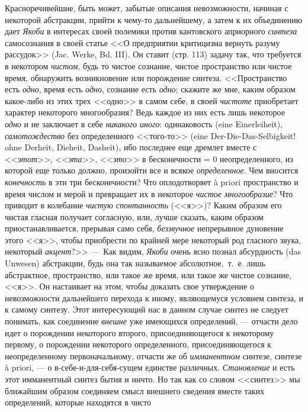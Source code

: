Красноречивейшие, быть может, забытые описания невозможности, начиная с
некоторой абстракции, прийти к чему-то дальнейшему, а затем к их
объединению дает {\em Якоби} в интересах своей полемики
против кантовского априорного {\em синтеза}
самосознания в своей статье <<О предприятии критицизма вернуть разуму
рассудок>> (Jac. Werke, Bd. III). Он ставит (стр. 113) задачу так, что
требуется в некотором {\em чистом}, будь то чистое
сознание, чистое пространство или чистое время, обнаружить возникновение
или порождение синтеза. <<Пространство есть {\em одно},
время есть {\em одно}, сознание есть
{\em одно}; скажите же мне, каким образом какое-либо из
этих трех <<одно>> в самом себе, в своей {\em чистоте}
приобретает характер некоторого многообразия? Ведь каждое из них есть лишь
некоторое {\em одно} и не заключает в себе
{\em никакого иного}: одинаковость (eine
Einerleiheit), {\em самотождество} без определенного
<<того-то>> (eine Der-Die-Das-Selbigkeit! ohne Derheit, Dieheit, Dasheit),
ибо последнее еще дремлет вместе с <<{\em этот}>>,
<<{\em эта}>>, <<{\em это}>> в
бесконечности = 0 неопределенного, из которой еще только должно, произойти
все и всякое {\em определенное}. Чем вносится
{\em конечность} в эти три бесконечности? Что
оплодотворяет à priori пространство и время числом и мерой и превращает их
в некоторое {\em чистое многообразие}? Что приводит в
колебание {\em чистую спонтанность} (<<я>>)? Каким
образом его чистая гласная получает согласную, или, лучше сказать, каким
образом приостанавливается, прерывая само себя,
{\em беззвучное} непрерывное дуновение этого <<я>>, чтобы
приобрести по крайней мере некоторый род гласного звука, некоторый
{\em акцент}?>> ---~Как видим,
{\em Якоби} очень ясно познал абсурдность (das Unwesen)
абстракции, будь она так называемое абсолютное,~т.~е. лишь абстрактное,
пространство, или такое же время, или такое же чистое сознание, <<я>>. Он
настаивает на этом, чтобы доказать свое утверждение о невозможности
дальнейшего перехода к иному, являющемуся условием синтеза, и к самому
синтезу. Этот интересующий нас в данном случае синтез не следует понимать,
как соединение {\em внешне} уже имеющихся определений,
--- отчасти дело идет о порождении некоторого второго, присоединяющегося к
некоторому первому, о порождении некоторого определенного,
присоединяющегося к неопределенному первоначальному, отчасти же об
{\em имманентном} синтезе, синтезе à priori, --- о
в-себе-и-для-себя-сущем единстве различных.
{\em Становление} и есть этот имманентный синтез бытия
и ничто. Но так как со словом <<синтез>> мы ближайшим образом соединяем смысл
внешнего сведения вместе таких определений, которые находятся в чисто
